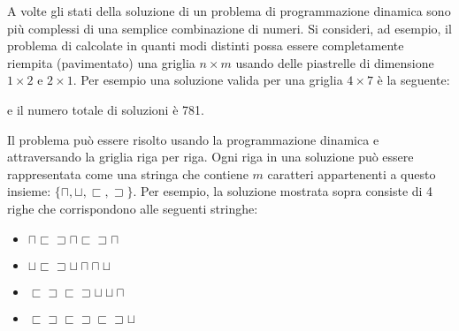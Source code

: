 A volte gli stati della soluzione di un problema di 
programmazione dinamica sono più complessi di 
una semplice combinazione di numeri.
Si consideri, ad esempio, il problema
di calcolate in quanti modi distinti 
possa essere completamente riempita
(pavimentato) una griglia $n \times m$ 
usando delle piastrelle di dimensione $1 \times 2$ e $2 \times 1$.
Per esempio una soluzione valida per una griglia $4 \times 7$ è
la seguente:
\begin{center}
\end{center}
e il numero totale di soluzioni è 781.

Il problema può essere risolto usando la programmazione dinamica e
attraversando la griglia riga per riga.
Ogni riga in una soluzione può essere rappresentata
come una stringa che contiene $m$ caratteri appartenenti a questo insieme: 
$\{\sqcap, \sqcup, \sqsubset, \sqsupset \}$.
Per esempio, la soluzione mostrata sopra consiste di 4 righe 
che corrispondono alle seguenti stringhe:
\begin{itemize}
\item
$\sqcap \sqsubset \sqsupset \sqcap \sqsubset \sqsupset \sqcap$
\item
$\sqcup \sqsubset \sqsupset \sqcup \sqcap \sqcap \sqcup$
\item
$\sqsubset \sqsupset \sqsubset \sqsupset \sqcup \sqcup \sqcap$ 
\item
$\sqsubset \sqsupset \sqsubset \sqsupset \sqsubset \sqsupset \sqcup$
\end{itemize}

